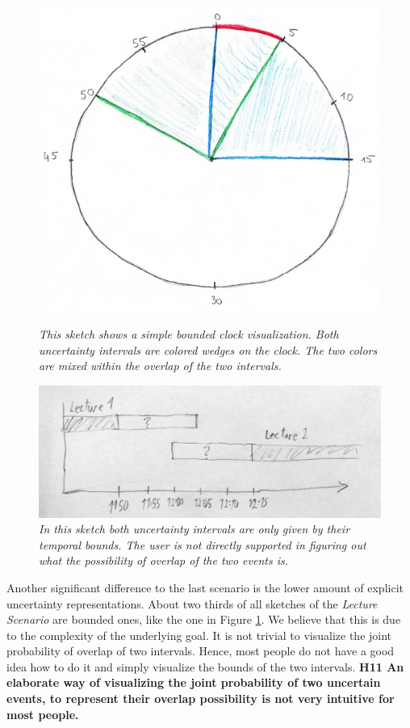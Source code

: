 \begin{figure}[H]
	\begin{minipage}{.5\textwidth}
		\centering
		\captionsetup{width=0.8\textwidth}
		\includegraphics[height=0.6\textwidth]{figures/t4clock.png}
		\caption{\textit{This sketch shows a simple bounded clock visualization. Both uncertainty intervals are colored wedges on the clock. The two colors are mixed within the overlap of the two intervals.}}
		\label{fig:t4clock}
	\end{minipage}
	\begin{minipage}{.5\textwidth}
		\centering
		\captionsetup{width=1.0\textwidth}
		\includegraphics[height=0.4\textwidth]{figures/t4bounded.jpg}
		\caption{\textit{In this sketch both uncertainty intervals are only given by their temporal bounds. The user is not directly supported in figuring out what the possibility of overlap of the two events is.}}
		\label{fig:t4bounded}
	\end{minipage}
\end{figure}

Another significant difference to the last scenario is the lower amount of explicit uncertainty representations. About two thirds of all sketches of the \textit{Lecture Scenario} are bounded ones, like the one in Figure \ref{fig:t4bounded}. We believe that this is due to the complexity of the underlying goal. It is not trivial to visualize the joint probability of overlap of two intervals. Hence, most people do not have a good idea how to do it and simply visualize the bounds of the two intervals. \textbf{H11 An elaborate way of visualizing the joint probability of two uncertain events, to represent their overlap possibility is not very intuitive for most people.} \par \medskip

